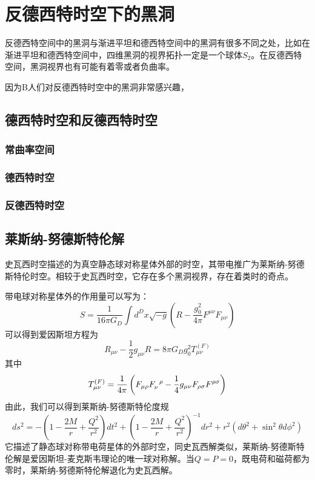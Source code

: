 \chapter{反德西特时空下的黑洞}
反德西特空间中的黑洞与渐进平坦和德西特空间中的黑洞有很多不同之处，比如在渐进平坦和德西特空间中，四维黑洞的视界拓扑一定是一个球体$S_2$\citep{friedman1993topological}。在反德西特空间，黑洞视界也有可能有着零或者负曲率\citep{cai2004thermodynamics}。

因为B人们对反德西特时空中的黑洞非常感兴趣，
\section{德西特时空和反德西特时空}
\subsection{常曲率空间}
\subsection{德西特时空}
\subsection{反德西特时空}
\section{莱斯纳-努德斯特伦解}
史瓦西时空描述的为真空静态球对称星体外部的时空，其带电推广为莱斯纳-努德斯特伦时空。相较于史瓦西时空，它存在多个黑洞视界，存在着类时的奇点。

带电球对称星体外的作用量可以写为：
\begin{equation}
    S=\frac{1}{16 \pi G_D}\int d^D x \sqrt{-g}\left(R-\frac{g_{0}^2}{4 \pi}F^{\mu \nu}F_{\mu \nu}\right)
\end{equation}
可以得到爱因斯坦方程为
\begin{equation}
    R_{\mu \nu}-\frac{1}{2}g_{\mu \nu}R=8\pi G_D g_0^2 T^{\left(F\right)}_{\mu \nu}
\end{equation}
其中
\begin{equation}
    T^{\left(F\right)}_{\mu \nu}=\frac{1}{4\pi}\left(F_{\mu \rho }F\indices{_{\nu}^{\rho}}-\frac{1}{4}g_{\mu \nu}F_{\rho \sigma}F^{\rho \sigma} \right)
\end{equation}
由此，我们可以得到莱斯纳-努德斯特伦度规\citep{陈斌2018广义相对论}
\begin{equation}\label{eq: RNmetric}
     ds^2=-\left(1-\frac{2M}{r}+\frac{Q^2}{r^2}\right)dt^2+\left(1-\frac{2M}{r}+\frac{Q^2}{r^2}\right)^{-1}dr^2+r^2\left(d\theta^2+\sin ^2 \theta d\phi^2\right)
\end{equation}
它描述了静态球对称带电荷星体的外部时空，同史瓦西解类似，莱斯纳-努德斯特伦解是爱因斯坦-麦克斯韦理论的唯一球对称解。当$Q=P=0$，既电荷和磁荷都为零时，莱斯纳-努德斯特伦解退化为史瓦西解。

